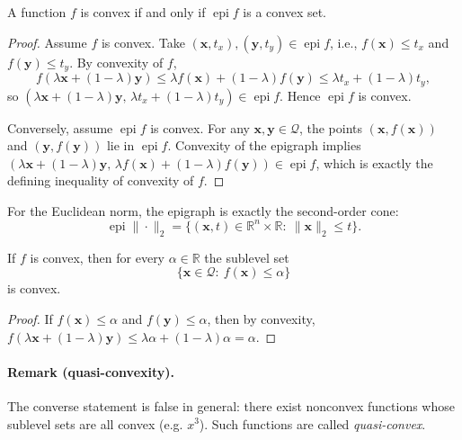 \begin{theorem}
\label{thm:ch4-epi-criterion}
A function $f$ is convex if and only if $\operatorname{epi} f$ is a convex set.
\end{theorem}
\begin{proof}
Assume $f$ is convex. Take $(\mathbf{x},t_x),(\mathbf{y},t_y)\in \operatorname{epi} f$, i.e.,
$f(\mathbf{x})\le t_x$ and $f(\mathbf{y})\le t_y$. By convexity of $f$,
\[
  f(\lambda\mathbf{x}+(1-\lambda)\mathbf{y})
  \le \lambda f(\mathbf{x})+(1-\lambda)f(\mathbf{y})
  \le \lambda t_x+(1-\lambda)t_y,
\]
so $(\lambda\mathbf{x}+(1-\lambda)\mathbf{y},\,\lambda t_x+(1-\lambda)t_y)\in \operatorname{epi} f$.
Hence $\operatorname{epi} f$ is convex.

Conversely, assume $\operatorname{epi} f$ is convex. For any $\mathbf{x},\mathbf{y}\in\mathcal{Q}$, the points
$(\mathbf{x},f(\mathbf{x}))$ and $(\mathbf{y},f(\mathbf{y}))$ lie in $\operatorname{epi} f$. Convexity of the epigraph
implies
$(\lambda\mathbf{x}+(1-\lambda)\mathbf{y},\,\lambda f(\mathbf{x})+(1-\lambda)f(\mathbf{y}))\in\operatorname{epi} f$,
which is exactly the defining inequality of convexity of $f$.
\end{proof}

\begin{example}
For the Euclidean norm, the epigraph is exactly the second-order cone:
\[
  \operatorname{epi}\|\cdot\|_2=\{(\mathbf{x},t)\in\mathbb{R}^n\times\mathbb{R}:\ \|\mathbf{x}\|_2\le t\}.
\]
\end{example}

\begin{claim}
If $f$ is convex, then for every $\alpha\in\mathbb{R}$ the sublevel set
\[
  \{\mathbf{x}\in\mathcal{Q}:\ f(\mathbf{x})\le \alpha\}
\]
is convex.
\end{claim}
\begin{proof}
If $f(\mathbf{x})\le \alpha$ and $f(\mathbf{y})\le \alpha$, then by convexity,
$f(\lambda\mathbf{x}+(1-\lambda)\mathbf{y})\le \lambda\alpha+(1-\lambda)\alpha=\alpha$.
\end{proof}

\paragraph{Remark (quasi-convexity).}
The converse statement is false in general: there exist nonconvex functions whose sublevel sets are all convex
(e.g. $x^{3}$).
Such functions are called \emph{quasi-convex}. 

